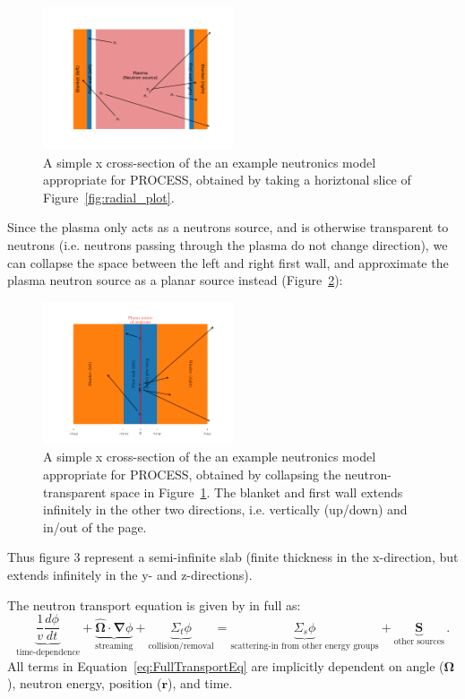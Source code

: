 \documentclass[a4paper, 12pt]{article}
\newcommand{\ve}[1]{\boldsymbol{#1}}
\begin{document}
\begin{figure}[H]
\centering
\includegraphics[width=0.5\textwidth]{semiinfinite_plot.pdf}
\caption{A simple x cross-section of the an example neutronics model appropriate for PROCESS, obtained by taking a horiztonal slice of Figure~\ref{fig:radial_plot}.} \label{fig:semiinfinite_plot}
\end{figure}

Since the plasma only acts as a neutrons source, and is otherwise transparent to neutrons (i.e. neutrons passing through the plasma do not change direction), we can collapse the space between the left and right first wall, and approximate the plasma neutron source as a planar source instead (Figure~\ref{fig:collapsed_geometry}):

\begin{figure}[H]
\centering
\includegraphics[width=0.5\textwidth]{collapsed_geometry.pdf}
\caption{A simple x cross-section of the an example neutronics model appropriate for PROCESS, obtained by collapsing the neutron-transparent space in Figure~\ref{fig:semiinfinite_plot}. The blanket and first wall extends infinitely in the other two directions, i.e. vertically (up/down) and in/out of the page.} \label{fig:collapsed_geometry}
\end{figure}

Thus figure 3 represent a semi-infinite slab (finite thickness in the x-direction, but extends infinitely in the y- and z-directions).

The neutron transport equation is given by \cite{Duderstadt} in full as:
\begin{equation}\label{eq:FullTransportEq}
    \underbrace{\frac{1}{v}\frac{d\phi}{dt}}_{\text{time-dependence}} +
    \underbrace{\hat{\ve{\Omega}}\cdot\ve{\nabla}\phi}_{\text{streaming}} +
    \underbrace{\Sigma_t \phi}_{\text{collision/removal}} =
    \underbrace{\Sigma_s \phi}_{\text{scattering-in from other energy groups}} +
    \underbrace{\ve{S}}_{\text{other sources}}\,.
\end{equation}
All terms in Equation~\ref{eq:FullTransportEq} are implicitly dependent on angle ($\ve{\Omega}$), neutron energy, position ($\ve{r}$), and time.
\end{document}
